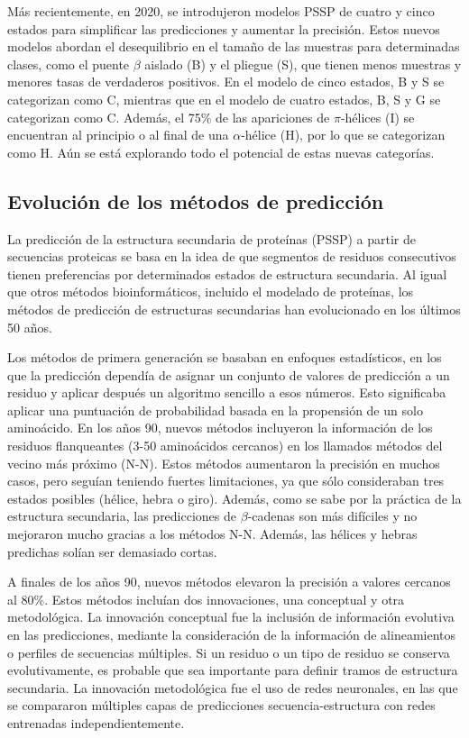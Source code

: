 Más recientemente, en 2020, se introdujeron modelos PSSP de cuatro y cinco estados para simplificar las predicciones y aumentar la precisión. Estos nuevos modelos abordan el desequilibrio en el tamaño de las muestras para determinadas clases, como el puente $\beta$ aislado (B) y el pliegue (S), que tienen menos muestras y menores tasas de verdaderos positivos. En el modelo de cinco estados, B y S se categorizan como C, mientras que en el modelo de cuatro estados, B, S y G se categorizan como C. Además, el 75\% de las apariciones de $\pi$-hélices (I) se encuentran al principio o al final de una $\alpha$-hélice (H), por lo que se categorizan como H. Aún se está explorando todo el potencial de estas nuevas categorías.

\subsection{Evolución de los métodos de predicción}
La predicción de la estructura secundaria de proteínas (PSSP) a partir de secuencias proteicas se basa en la idea de que segmentos de residuos consecutivos tienen preferencias por determinados estados de estructura secundaria. Al igual que otros métodos bioinformáticos, incluido el modelado de proteínas, los métodos de predicción de estructuras secundarias han evolucionado en los últimos 50 años.

Los métodos de primera generación se basaban en enfoques estadísticos, en los que la predicción dependía de asignar un conjunto de valores de predicción a un residuo y aplicar después un algoritmo sencillo a esos números. Esto significaba aplicar una puntuación de probabilidad basada en la propensión de un solo aminoácido. En los años 90, nuevos métodos incluyeron la información de los residuos flanqueantes (3-50 aminoácidos cercanos) en los llamados métodos del vecino más próximo (N-N). Estos métodos aumentaron la precisión en muchos casos, pero seguían teniendo fuertes limitaciones, ya que sólo consideraban tres estados posibles (hélice, hebra o giro). Además, como se sabe por la práctica de la estructura secundaria, las predicciones de $\beta$-cadenas son más difíciles y no mejoraron mucho gracias a los métodos N-N. Además, las hélices y hebras predichas solían ser demasiado cortas.

A finales de los años 90, nuevos métodos elevaron la precisión a valores cercanos al 80\%. Estos métodos incluían dos innovaciones, una conceptual y otra metodológica. La innovación conceptual fue la inclusión de información evolutiva en las predicciones, mediante la consideración de la información de alineamientos o perfiles de secuencias múltiples. Si un residuo o un tipo de residuo se conserva evolutivamente, es probable que sea importante para definir tramos de estructura secundaria. La innovación metodológica fue el uso de redes neuronales, en las que se compararon múltiples capas de predicciones secuencia-estructura con redes entrenadas independientemente.

